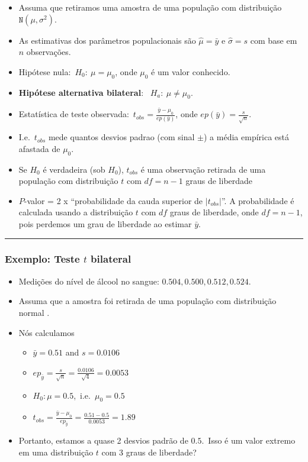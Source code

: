 \documentclass[]{article}
\providecommand{\tightlist}{%
  \setlength{\itemsep}{0pt}\setlength{\parskip}{0pt}}
\begin{document}
\begin{itemize}
\tightlist
\item
  Assuma que retiramos uma amostra de uma população com distribuição
  \(\texttt{N}(\mu,\sigma^{2})\).
\item
  As estimativas dos parâmetros populacionais são \(\hat{\mu}=\bar{y}\)
  e \(\hat{\sigma}=s\) com base em \(n\) observações.
\item
  Hipótese nula:~\(H_0:\ \mu = \mu_0\), onde \(\mu_0\) é um valor
  conhecido.
\item
  \textbf{Hipótese alternativa bilateral}:~ \(H_a:\ \mu \neq \mu_0\).
\item
  Estatística de teste
  observada:~\(t_{obs} = \frac{\bar{y} - \mu_0}{ep(\bar{y})}\), onde
  \(ep(\bar{y}) = \frac{s}{\sqrt{n}}\).
\item
  I.e.~\(t_{obs}\) mede quantos desvios padrao (com sinal \(\pm\)) a
  média empírica está afastada de \(\mu_0\).
\item
  Se \(H_0\) é verdadeira (sob \(H_0\)), \(t_{obs}\) é uma observação
  retirada de uma população com distribuição \(t\) com \(df = n - 1\)
  graus de liberdade
\item
  \(P\)-valor = 2 x ``probabilidade da cauda superior de
  \(|t_{obs}|\)''. A probabilidade é calculada usando a distribuição
  \(t\) com \(df\) graus de liberdade, onde \(df = n - 1\), pois
  perdemos um grau de liberdade ao estimar \(\bar{y}\).
\end{itemize}

\begin{center}\rule{0.5\linewidth}{\linethickness}\end{center}

\subsubsection{\texorpdfstring{Exemplo: Teste \(t\)
bilateral}{Exemplo: Teste t bilateral}}\label{exemplo-teste-t-bilateral}

\begin{itemize}
\tightlist
\item
  Medições do nível de álcool no sangue: \(0.504, 0.500, 0.512, 0.524\).
\item
  Assuma que a amostra foi retirada de uma população com distribuição
  normal .
\item
  Nós calculamos

  \begin{itemize}
  \tightlist
  \item
    \(\bar{y} = 0.51\) and \(s = 0.0106\)
  \item
    \(ep_{\bar{y}} = \frac{s}{\sqrt{n}} = \frac{0.0106}{\sqrt{4}} = 0.0053\)
  \item
    \(H_0: \mu = 0.5\),~i.e.~\(\mu_0 = 0.5\)
  \item
    \(t_{obs} = \frac{\bar{y}-\mu_0}{ep_\bar{y}} = \frac{0.51-0.5}{0.0053} = 1.89\)
  \end{itemize}
\item
  Portanto, estamos a quase 2 desvios padrão de \(0.5\).~Isso é um valor
  extremo em uma distribuição \(t\) com 3 graus de liberdade?
\end{itemize}
\end{document}
